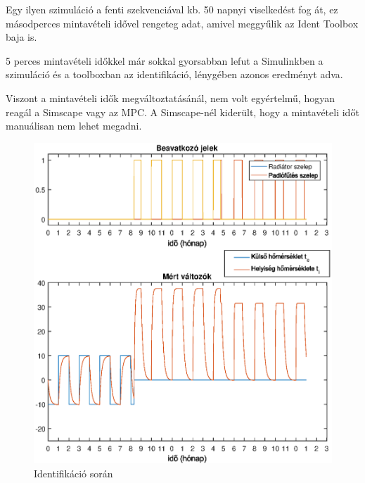 Egy ilyen szimuláció a fenti szekvenciával kb. 50 napnyi viselkedést fog át, ez másodperces mintavételi idővel rengeteg adat, amivel meggyűlik az Ident Toolbox baja is.

5 perces mintavételi időkkel már sokkal gyorsabban lefut a Simulinkben a szimuláció és a toolboxban az identifikáció, lénygében azonos eredményt adva.

Viszont a mintavételi idők megváltoztatásánál, nem volt egyértelmű, hogyan reagál a Simscape vagy az MPC. A Simscape-nél kiderült, hogy a mintavételi időt manuálisan nem lehet megadni.


\begin{figure}[H]
	\centering
	\includegraphics[trim=0 0 0 0, clip,width=\textwidth]{figures/ident-valve3}
	\caption{Identifikáció során }
	\label{fig:ident}
\end{figure}

